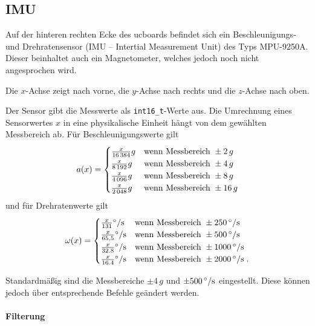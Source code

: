 \subsection{IMU}

Auf der hinteren rechten Ecke des ucboards befindet sich ein Beschleunigungs- und Drehratensensor (IMU -- Intertial Measurement Unit) des Typs MPU-9250A. \textcolor[rgb]{0.75,0.75,0.75}{Dieser beinhaltet auch ein Magnetometer, welches jedoch noch nicht angesprochen wird.}

Die $x$-Achse zeigt nach vorne, die $y$-Achse nach rechts und die $z$-Achse nach oben.

Der Sensor gibt die Messwerte als \texttt{int16\_t}-Werte aus. Die Umrechnung eines Sensorwertes $x$ in eine physikalische Einheit hängt von dem gewählten Messbereich ab. Für Beschleunigungswerte gilt
\begin{align*}
	a(x)
		=
			\begin{cases}
				\frac{x}{16\,384} g & \textnormal{wenn Messbereich } \pm 2\,g \\
				\frac{x}{8\,192} g & \textnormal{wenn Messbereich } \pm 4\,g \\
				\frac{x}{4\,096} g & \textnormal{wenn Messbereich } \pm 8\,g \\
				\frac{x}{2\,048} g & \textnormal{wenn Messbereich } \pm 16\,g 
			\end{cases}
\end{align*}
und für Drehratenwerte gilt
\begin{align*}
	\omega(x)
		=
			\begin{cases}
				\frac{x}{131} \mrm{\degree / s} & \tn{wenn Messbereich } \pm \valunit{250}{\degree / s} \\
				\frac{x}{65,5} \mrm{\degree / s} & \tn{wenn Messbereich } \pm \valunit{500}{\degree / s} \\
				\frac{x}{32.8} \mrm{\degree / s} & \tn{wenn Messbereich } \pm \valunit{1000}{\degree / s} \\
				\frac{x}{16.4} \mrm{\degree / s} & \tn{wenn Messbereich } \pm \valunit{2000}{\degree / s}\;.
			\end{cases}
\end{align*}

Standardmäßig sind die Messbereiche $\pm 4\,g$ und $\pm \valunit{500}{\degree / s}$ eingestellt. \textcolor[rgb]{0.75,0.75,0.75}{Diese können jedoch über entsprechende Befehle geändert werden.}


\paragraph{Filterung}





